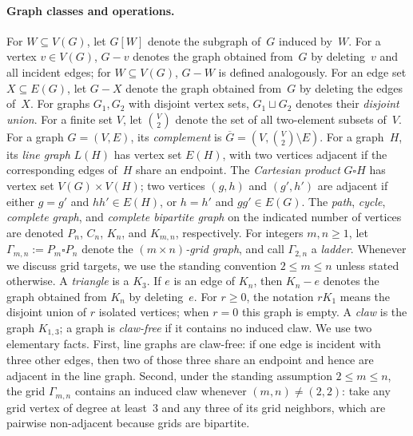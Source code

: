 \documentclass[a4paper]{article}
\theoremstyle{plain}
\theoremstyle{definition}
\numberwithin{equation}{section}
\begin{document}
\paragraph{Graph classes and operations.}
For $W\subseteq V(G)$, let $G[W]$ denote the subgraph of~$G$ induced by~$W$.
For a vertex $v\in V(G)$, $G-v$ denotes the graph obtained from~$G$ by deleting~$v$ and all incident edges; for $W\subseteq V(G)$, $G-W$ is defined analogously.
For an edge set $X\subseteq E(G)$, let $G-X$ denote the graph obtained from~$G$ by deleting the edges of~$X$.
For graphs $G_1,G_2$ with disjoint vertex sets, $G_1\sqcup G_2$ denotes their \emph{disjoint union}.
For a finite set $V$, let $\displaystyle \binom{V}{2}$ denote the set of all two-element subsets of~$V$.
For a graph $G=(V,E)$, its \emph{complement} is $\displaystyle \overline{G}=(V,\binom{V}{2}\setminus E)$.
For a graph~$H$, its \emph{line graph} $L(H)$ has vertex set $E(H)$, with two vertices adjacent if the corresponding edges of~$H$ share an endpoint.
The \emph{Cartesian product} $G\square H$ has vertex set $V(G)\times V(H)$; two vertices $(g,h)$ and $(g',h')$ are adjacent if either $g=g'$ and $hh'\in E(H)$, or $h=h'$ and $gg'\in E(G)$.
The \emph{path}, \emph{cycle}, \emph{complete graph}, and \emph{complete bipartite graph} on the indicated number of vertices are denoted $P_n$, $C_n$, $K_n$, and $K_{m,n}$, respectively.
For integers $m,n\ge 1$, let $\Gamma_{m,n}:=P_m\square P_n$ denote the \emph{$(m\times n)$-grid graph}, and call $\Gamma_{2,n}$ a \emph{ladder}.
Whenever we discuss grid targets, we use the standing convention $2\le m\le n$ unless stated otherwise.
A \emph{triangle} is a $K_3$.
If $e$ is an edge of $K_n$, then $K_n-e$ denotes the graph obtained from $K_n$ by deleting~$e$.
For $r\ge 0$, the notation $rK_1$ means the disjoint union of $r$ isolated vertices; when $r=0$ this graph is empty.
A \emph{claw} is the graph $K_{1,3}$; a graph is \emph{claw-free} if it contains no induced claw.
We use two elementary facts.
First, line graphs are claw-free: if one edge is incident with three other edges, then two of those three share an endpoint and hence are adjacent in the line graph.
Second, under the standing assumption $2\le m\le n$, the grid $\Gamma_{m,n}$ contains an induced claw whenever $(m,n)\ne(2,2)$: take any grid vertex of degree at least~$3$ and any three of its grid neighbors, which are pairwise non-adjacent because grids are bipartite.
\end{document}
